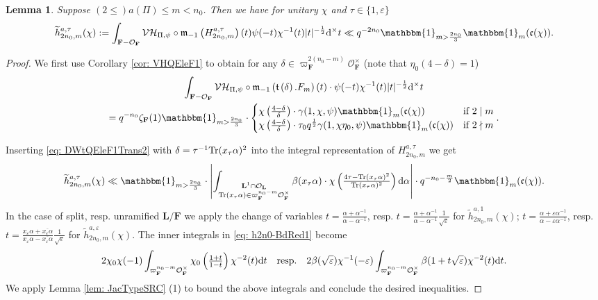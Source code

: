 \documentclass[A4]{amsart}
\def\leq{\leqslant}
\newtheorem{lemma}      [theorem]{Lemma}
\numberwithin{equation}{section} \everymath{\displaystyle}
\newcommand{\Tr}{{\rm Tr}}
\newcommand{\id}{\mathbbm{1}}
\newcommand{\ud}{\mathrm{d}}
\newcommand{\F}{\mathbf{F}}
\newcommand{\bL}{\mathbf{L}}
\newcommand{\vO}{\mathcal{O}}
\newcommand{\norm}[1][\cdot]{\lvert #1 \rvert}
\newcommand{\extnorm}[1]{\left\lvert #1 \right\rvert}
\newcommand{\Mult}{\mathfrak{m}}
\newcommand{\VorH}{\mathcal{VH}}
\newcommand{\Trans}{\mathfrak{t}}
\newcommand{\cond}{\mathfrak{c}}
\begin{document}
\begin{lemma} \label{lem: e1DWt-FineBd2}
	Suppose $(2 \leq) a(\Pi) \leq m < n_0$. Then we have for unitary $\chi$ and $\tau \in \{ 1, \varepsilon \}$
	$$ \widetilde{h}_{2n_0,m}^{a,\tau}(\chi) := \int_{\F-\vO_{\F}} \VorH_{\Pi,\psi} \circ \Mult_{-1} \left( H_{2n_0,m}^{a,\tau} \right)(t) \psi(-t)\chi^{-1}(t)\norm[t]^{-\frac{1}{2}} \ud^{\times} t \ll q^{-2n_0} \id_{m > \frac{2n_0}{3}} \id_m(\cond(\chi)). $$
\end{lemma}
\begin{proof}
	We first use Corollary \ref{cor: VHQEleF1} to obtain for any $\delta \in \varpi_{\F}^{2(n_0-m)} \vO_{\F}^{\times}$ (note that $\eta_0(4-\delta)=1$)
\begin{multline} \label{eq: DWtQEleF1Trans2}
	\int_{\F-\vO_{\F}} \VorH_{\Pi,\psi} \circ \Mult_{-1} \left( \Trans \left( \delta \right).F_m \right)(t) \cdot \psi(-t) \chi^{-1}(t) \norm[t]^{-\frac{1}{2}} \ud^{\times} t \\
	= q^{-n_0} \zeta_{\F}(1) \id_{m > \frac{2n_0}{3}} \cdot \begin{cases}
		\chi \left( \tfrac{4-\delta}{\delta} \right) \cdot \gamma(1,\chi,\psi) \id_{m}(\cond(\chi)) & \text{if } 2 \mid m \\
		\chi \left( \tfrac{4-\delta}{\delta} \right) \cdot \tau_0 q^{\frac{1}{2}} \gamma(1,\chi\eta_0,\psi) \id_{m}(\cond(\chi)) & \text{if } 2 \nmid m
	\end{cases}.
\end{multline}
	
\noindent Inserting \eqref{eq: DWtQEleF1Trans2} with $\delta = \tau^{-1} \Tr(x_{\tau} \alpha)^2$ into the integral representation of $H_{2n_0,m}^{a,\tau}$ we get
\begin{equation} \label{eq: h2n0-BdRed1}
	\widetilde{h}_{2n_0,m}^{a,\tau}(\chi) \ll \id_{m > \frac{2n_0}{3}} \cdot \extnorm{ \int_{\substack{\bL^1 \cap \vO_{\bL} \\ \Tr(x_{\tau} \alpha) \in \varpi_{\F}^{n_0-m} \vO_{\F}^{\times}}} \beta(x_{\tau} \alpha) \cdot \chi \left( \tfrac{4 \tau -\Tr(x_{\tau} \alpha)^2}{\Tr(x_{\tau} \alpha)^2} \right) \ud \alpha } \cdot q^{-n_0-\frac{m}{2}} \id_{m}(\cond(\chi)).
\end{equation}
	In the case of split, resp. unramified $\bL/\F$ we apply the change of variables $t = \tfrac{\alpha + \alpha^{-1}}{\alpha - \alpha^{-1}}$, resp. $t = \tfrac{\alpha + \alpha^{-1}}{\alpha - \alpha^{-1}} \tfrac{1}{\sqrt{\varepsilon}}$ for $\widetilde{h}_{2n_0,m}^{a,1}(\chi)$; $t = \tfrac{\alpha + \varepsilon \alpha^{-1}}{\alpha - \varepsilon \alpha^{-1}}$, resp. $t = \tfrac{x_{\varepsilon}\alpha + \overline{x_{\varepsilon}\alpha}}{x_{\varepsilon}\alpha - \overline{x_{\varepsilon}\alpha}} \tfrac{1}{\sqrt{\varepsilon}}$ for $\widetilde{h}_{2n_0,m}^{a,\varepsilon}(\chi)$. The inner integrals in \eqref{eq: h2n0-BdRed1} become
	$$ 2 \chi_0\chi(-1) \int_{\varpi_{\F}^{n_0-m} \vO_{\F}^{\times}} \chi_0 \left( \tfrac{1+t}{1-t} \right) \chi^{-2}(t) \ud t \quad {\rm resp.} \quad 2\beta(\sqrt{\varepsilon})\chi^{-1}(-\varepsilon) \int_{\varpi_{\F}^{n_0-m} \vO_{\F}^{\times}} \beta(1+t \sqrt{\varepsilon}) \chi^{-2}(t) \ud t. $$
	We apply Lemma \ref{lem: JacTypeSRC} (1) to bound the above integrals and conclude the desired inequalities.
\end{proof}
\end{document}
